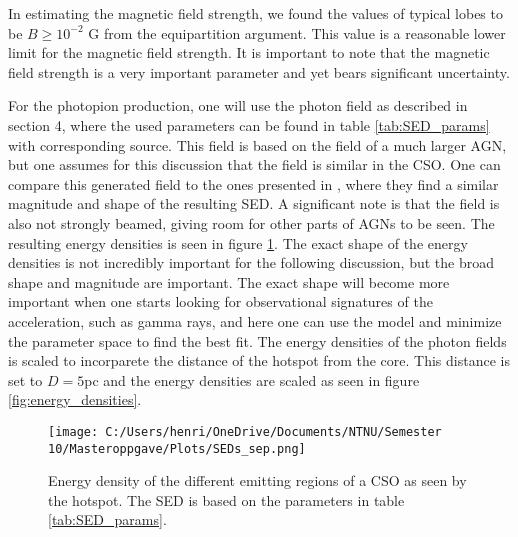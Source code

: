 In estimating the magnetic field strength, we found the values of typical lobes to be $B \ge 10^{-2}$ G from the equipartition argument. This value is a reasonable lower limit for the magnetic field strength. It is important to note that the magnetic field strength is a very important parameter and yet bears significant uncertainty. 

For the photopion production, one will use the photon field as described in section 4, where the used parameters can be found in table \ref{tab:SED_params} with corresponding source. This field is based on the field of a much larger AGN, but one assumes for this discussion that the field is similar in the CSO. One can compare this generated field to the ones presented in \cite{bronzini2024investigating}, where they find a similar magnitude and shape of the resulting SED. A significant note is that the field is also not strongly beamed, giving room for other parts of AGNs to be seen. The resulting energy densities is seen in figure \ref{fig:SED_sep}. The exact shape of the energy densities is not incredibly important for the following discussion, but the broad shape and magnitude are important. The exact shape will become more important when one starts looking for observational signatures of the acceleration, such as gamma rays, and here one can use the model and minimize the parameter space to find the best fit. The energy densities of the photon fields is scaled to incorparete the distance of the hotspot from the core. This distance is set to $D = 5$pc and the energy densities are scaled as seen in figure \ref{fig:energy_densities}.  


\begin{figure}
    \centering
    \texttt{[image: C:/Users/henri/OneDrive/Documents/NTNU/Semester 10/Masteroppgave/Plots/SEDs\_sep.png]}
    \caption{Energy density of the different emitting regions of a CSO as seen by the hotspot. The SED is based on the parameters in table \ref{tab:SED_params}.}
    \label{fig:SED_sep}
\end{figure}






